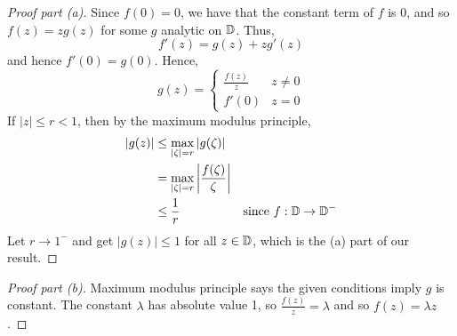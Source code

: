 \documentclass[12pt]{article}
\begin{document}
\begin{proof}[Proof part (a)]
    Since $f(0)=0$, we have that the constant term of $f$ is 0, and so $f(z)=zg(z)$ for some $g$ analytic on $\mathbb{D}$. Thus, \[f'(z)=g(z)+zg'(z)\] and hence $f'(0)=g(0)$. Hence, \[g(z)=\begin{cases}
        \frac{f(z)}{z} & z\neq 0\\
        f'(0) &z=0
    \end{cases}\]
    If $|z|\leq r<1$, then by the maximum modulus principle, \begin{align*}
        |g(z)|&\leq \max_{|\zeta|=r}|g(\zeta)|\\
        &= \max_{|\zeta|=r}\left|\frac{f(\zeta)}{\zeta}\right|\\
        &\leq \frac{1}{r} &\text{since }f:\mathbb{D}\to\mathbb{D}^-
    \end{align*}
    Let $r\to 1^-$ and get $|g(z)|\leq 1$ for all $z\in \mathbb{D}$, which is the (a) part of our result.
\end{proof}

\begin{proof}[Proof part (b)]
    Maximum modulus principle says the given conditions imply $g$ is constant. The constant $\lambda$ has absolute value 1, so $\frac{f(z)}{z}=\lambda$ and so $f(z)=\lambda z$.
\end{proof}
\end{document}
